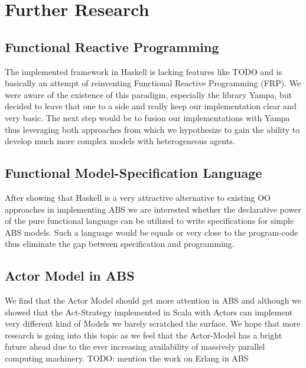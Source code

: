 \section{Further Research}

\subsection{Functional Reactive Programming}
The implemented framework in Haskell is lacking features like TODO and is basically an attempt of reinventing Functional Reactive Programming (FRP). We were aware of the existence of this paradigm, especially the library Yampa, but decided to leave that one to a side and really keep our implementation clear and very basic. The next step would be to fusion our implementations with Yampa thus leveraging both approaches from which we hypothesize to gain the ability to develop much more complex models with heterogeneous agents.

\subsection{Functional Model-Specification Language}
After showing that Haskell is a very attractive alternative to existing OO approaches in implementing ABS we are interested whether the declarative power of the pure functional language can be utilized to write specifications for simple ABS models. Such a language would be equals or very close to the program-code thus eliminate the gap between specification and programming.

\subsection{Actor Model in ABS}
We find that the Actor Model should get more attention in ABS and although we showed that the Act-Strategy implemented in Scala with Actors can implement very different kind of Models we barely scratched the surface. We hope that more research is going into this topic as we feel that the Actor-Model has a bright future ahead due to the ever increasing availability of massively parallel computing machinery. TODO: mention the work on Erlang in ABS 